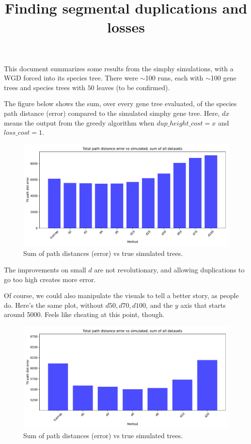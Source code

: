 \documentclass{article}
\title{Finding segmental duplications and losses}
\date{}
\begin{document}
This document summarizes some results from the simphy simulations, with a WGD forced into its species tree.  There were $\sim$100 runs, each with $\sim$100 gene trees and species trees with $50$ leaves (to be confirmed).

The figure below shows the sum, over every gene tree evaluated, of the species  path distance (error) compared to the simulated simphy gene tree.
Here, $dx$ means the output from the greedy algorithm when $dup\_height\_cost = x$ and $loss\_cost = 1$.

\begin{figure}[H]
    \centering
    \includegraphics[width=\textwidth]{plots/dists.pdf}
    \caption{Sum of path distances (error) vs true simulated trees.  }
    \label{fig:enter-label}
\end{figure}

The improvements on small $d$ are not revolutionary, and allowing duplications to go too high creates more error.


\clearpage


Of course, we could also manipulate the visuals to tell a better story, as people do.  Here's the same plot, without $d50, d70, d100$, and the $y$ axis that starts around 5000.
Feels like cheating at this point, though.

\begin{figure}[H]
    \centering
    \includegraphics[width=\textwidth]{plots/dists_cheating.pdf}
    \caption{Sum of path distances (error) vs true simulated trees.  }
    \label{fig:enter-label}
\end{figure}
\end{document}
